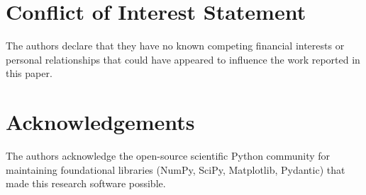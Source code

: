 \documentclass[final,5p,times,twocolumn]{elsarticle}
\begin{document}
\section*{Conflict of Interest Statement}
The authors declare that they have no known competing financial interests or personal relationships that could have appeared to influence the work reported in this paper.

\section*{Acknowledgements}
The authors acknowledge the open-source scientific Python community for maintaining foundational libraries (NumPy, SciPy, Matplotlib, Pydantic) that made this research software possible.



\end{document}
